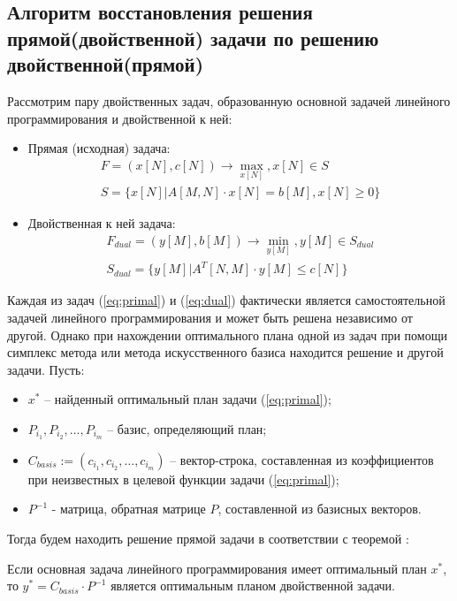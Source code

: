 \documentclass[main.tex]{subfiles}
\begin{document}
	\subsection {Алгоритм восстановления решения прямой(двойственной) задачи по решению двойственной(прямой)}
	Рассмотрим пару двойственных задач, образованную основной задачей линейного программирования и двойственной к ней:
	\begin{itemize}
		\item Прямая (исходная) задача:
		\begin{equation}\label{eq:primal}
		\begin{array}{ll}
		F = (x[N],c[N])\longrightarrow \max_{x[N]}, x[N] \in S\\
		S =\{x[N]|A[M,N]\cdot x[N] = b[M], x[N] \ge 0\}
		\end{array}
		\end{equation}
		\item Двойственная к ней  задача:
		\begin{equation}\label{eq:dual}
		\begin{array}{ll}
		F_{dual} = (y[M],b[M])\longrightarrow \min_{y[M]}, y[M] \in S_{dual}\\
		S_{dual} =\{y[M]|A^{T}[N,M]\cdot y[M] \le c[N]\}
		\end{array}
		\end{equation}
	\end{itemize}
	Каждая из задач (\ref{eq:primal}) и (\ref{eq:dual}) фактически является самостоятельной задачей линейного программирования и может быть решена независимо от другой. Однако при нахождении оптимального плана одной из задач при помощи симплекс метода или метода искусственного базиса находится решение и другой задачи.
	\newline Пусть: \begin{itemize}
		\item $x^{*}$ -- найденный оптимальный план  задачи (\ref{eq:primal});
		\item $P_{i_1}, P_{i_2}, \ldots, P_{i_m}$ -- базис, определяющий план; \item $C_{basis} := (c_{i_1}, c_{i_2}, \ldots, c_{i_m})$ -- вектор-строка, составленная из коэффициентов при неизвестных в целевой функции задачи (\ref{eq:primal});
		\item $P^{-1}$ - матрица, обратная матрице $P$, составленной из базисных векторов.
	\end{itemize}
	Тогда будем находить решение прямой задачи в соответствии с теоремой \cite{akulich}: \begin{theorem}Если основная задача линейного программирования имеет оптимальный план $x^{*}$, то $y^{*} = C_{basis}\cdot P^{-1}$ является оптимальным планом двойственной задачи.\end{theorem}
	
\end{document}
